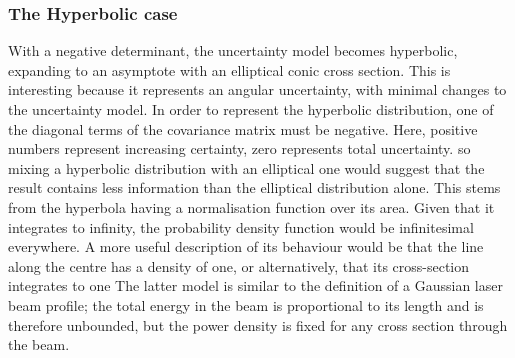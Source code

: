 \documentclass[a4paper, 11pt, titlepage]{article}
\begin{document}
    \subsubsection{The Hyperbolic case}
      \label{sec:hyperbolicCase}
      With a negative determinant, the uncertainty model becomes hyperbolic, expanding to an asymptote with an elliptical conic cross section.  This is interesting because it represents an angular uncertainty, with minimal changes to the uncertainty model.
      In order to represent the hyperbolic distribution, one of the diagonal terms of the covariance matrix must be negative.  Here, positive numbers represent increasing certainty, zero represents total uncertainty.  so mixing a hyperbolic distribution with an elliptical one would suggest that the result contains less information than the elliptical distribution alone.
      This stems from the hyperbola having a normalisation function over its area.  Given that it integrates to infinity, the probability density function would be infinitesimal everywhere.  A more useful description of its behaviour would be that the line along the centre has a density of one, or alternatively, that its cross-section integrates to one
      The latter model is similar to the definition of a Gaussian laser beam profile; the total energy in the beam is proportional to its length and is therefore unbounded, but the power density is fixed for any cross section through the beam.
\end{document}
